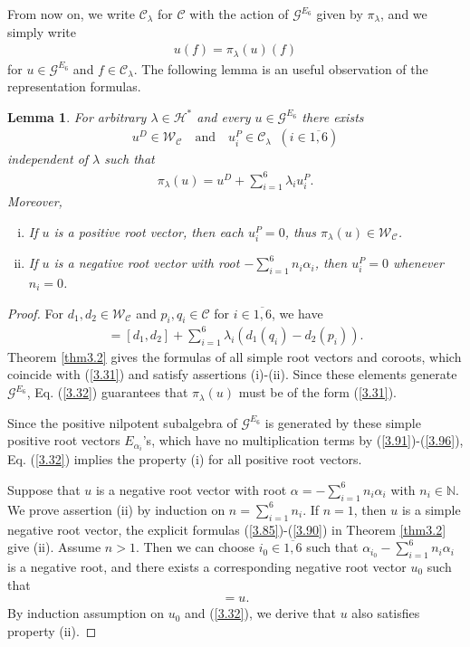 \documentclass[12pt]{article}
\numberwithin{equation}{section}
\newtheorem{lemma}[theorem]{Lemma}
\theoremstyle{definition}
\theoremstyle{remark}
\begin{document}
From now on, we write $\mathscr{C}_{\lambda}$ for $\mathscr{C}$ with the action of $\mathscr{G}^{E_6}$ given by $\pi_\lambda$, and we simply write
\begin{eqnarray}
	u(f)=\pi_{\lambda}(u)(f)
\end{eqnarray}
for $u\in\mathscr{G}^{E_6}$ and $f\in\mathscr{C}_{\lambda}$.
The following lemma is an useful observation of the representation formulas.
\begin{lemma}\label{lem3.3}
	For arbitrary $\lambda\in \mathscr{H}^*$ and every $u\in\mathscr{G}^{E_6}$ there exists
	\begin{eqnarray}
		u^{D}\in\mathscr{W}_{\mathscr{C}}\quad\text{and}\quad u^P_i\in\mathscr{C}_{\lambda}\;\;(i\in\overline{1,6})
	\end{eqnarray}
	independent of $\lambda$ such that
	\begin{eqnarray}
		\pi_{\lambda}(u)=u^D+\sum_{i=1}^6\lambda_iu^P_i.\label{3.31}
	\end{eqnarray}
	Moreover, 
	\begin{enumerate}[(i)]
		\item If $u$ is a positive root vector, then each $u_{i}^{P}=0$, thus $\pi_\lambda(u)\in\mathscr{W}_{\mathscr{C}}$.
		\item If $u$ is a negative root vector with root $-\sum_{i=1}^6n_i\alpha_i$, then $u_{i}^{P}=0$ whenever $n_i=0$.
	\end{enumerate}
\end{lemma}
\begin{proof}
	For $d_1,d_2\in\mathscr{W}_\mathscr{C}$ and $p_i,q_i\in\mathscr{C}$ for $i\in\overline{1,6}$, we have
	\begin{eqnarray}
		[d_1+\sum_{i=1}^6\lambda_ip_i,d_2+\sum_{i=1}^6\lambda_iq_i]=[d_1,d_2]+\sum_{i=1}^6 \lambda_i(d_1(q_i)-d_2(p_i)). \label{3.32}
	\end{eqnarray}
	Theorem \ref{thm3.2} gives the formulas of all simple root vectors and coroots, which coincide with (\ref{3.31}) and satisfy assertions (i)-(ii). Since these elements generate $\mathscr{G}^{E_6}$, Eq. (\ref{3.32}) guarantees that $\pi_{\lambda}(u)$ must be of the form (\ref{3.31}). 
	
	Since the positive nilpotent subalgebra of $\mathscr{G}^{E_6}$ is generated by these simple positive root vectors $E_{\alpha_i}$'s, which have no multiplication terms by (\ref{3.91})-(\ref{3.96}), Eq. (\ref{3.32}) implies the property (i) for all positive root vectors.
	
	Suppose that $u$ is a negative root vector with root $\alpha=-\sum_{i=1}^6n_i\alpha_i$ with $n_i\in\mathbb{N}$. We prove assertion (ii) by induction on $n=\sum_{i=1}^6n_i$. If $n=1$, then $u$ is a simple negative root vector, the explicit formulas (\ref{3.85})-(\ref{3.90}) in Theorem \ref{thm3.2} give (ii). Assume $n>1$. Then we can choose $i_0\in\overline{1,6}$ such that $\alpha_{i_0}-\sum_{i=1}^6n_i\alpha_i$ is a negative root, and there exists a corresponding negative root vector $u_0$ such that 
	\begin{align}
		[E_{-\alpha_{i_0}},u_0]=u.
	\end{align}
	By induction assumption on $u_0$ and (\ref{3.32}), we derive that $u$ also satisfies property (ii).
\end{proof}
\end{document}
